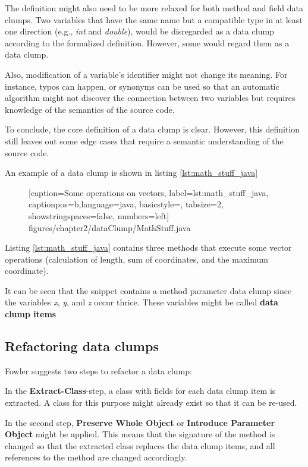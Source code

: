 The definition might also need to be more relaxed for both method and field data clumps. Two variables that have the same name but a compatible type in at least one direction  (e.g., \textit{int} and  \textit{double}), would be disregarded as a data clump according to the formalized definition. However, some would regard them as a data clump.

Also, modification of a variable's identifier might not change its meaning. For instance, typos can happen, or synonyms can be used so that an automatic algorithm might not discover the connection between two variables but requires knowledge of the semantics of the source code. \cite{zhangImprovingPrecisionFowler2008}


To conclude, the core definition of a data clump is clear. However, this definition still leaves out some edge cases that require a semantic understanding of the source code. 

An example of a data clump is shown in listing \ref{lst:math_stuff_java}
\begin{figure} [htbp!]
			
			[caption={Some operations on vectors},
			label={lst:math_stuff_java},
			captionpos=b,language=java, basicstyle=\footnotesize, tabsize=2, showstringspaces=false,  numbers=left]
			{figures/chapter2/dataClump/MathStuff.java}
		\end{figure}



Listing \ref{lst:math_stuff_java} contains three methods that execute some vector operations (calculation of length, sum of coordinates, and the maximum coordinate). 


It can be seen that  the snippet contains a method parameter data clump since the variables \textit{x}, \textit{y}, and  \textit{z} occur thrice.  These variables might be called \textbf{data clump items}
  
\subsection{Refactoring data clumps}
Fowler suggests two  steps to refactor a data clump:

In the  \textbf{Extract-Class}-step, a class with fields for each data clump item is extracted. A class for this purpose might already exist so that it can be re-used.

In the second step, \textbf{Preserve Whole Object} or \textbf{Introduce Parameter Object} might be applied. This means that the signature of the method is changed so that the extracted class replaces the data clump items, and all references to the method are changed accordingly.


